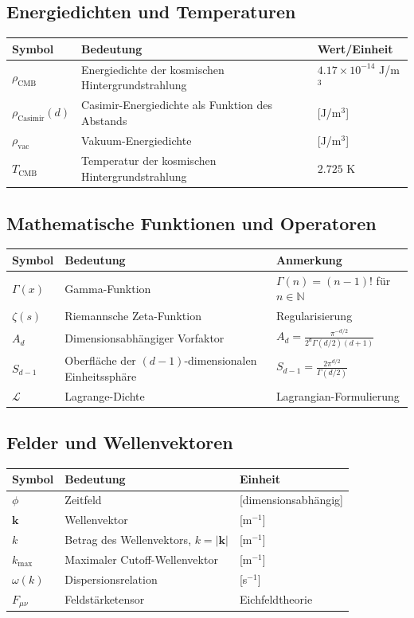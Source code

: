 	\subsection{Energiedichten und Temperaturen}
	\begin{longtable}{p{2cm} p{8cm} p{3cm}}
		\toprule
		\textbf{Symbol} & \textbf{Bedeutung} & \textbf{Wert/Einheit} \\
		\midrule
		$\rho_{\text{CMB}}$ & Energiedichte der kosmischen Hintergrundstrahlung & $4.17 \times 10^{-14}$ J/m$^3$ \\
		$\rho_{\text{Casimir}}(d)$ & Casimir-Energiedichte als Funktion des Abstands & [J/m$^3$] \\
		$\rho_{\text{vac}}$ & Vakuum-Energiedichte & [J/m$^3$] \\
		$T_{\text{CMB}}$ & Temperatur der kosmischen Hintergrundstrahlung & $2.725$ K \\
		\bottomrule
	\end{longtable}
	
	\subsection{Mathematische Funktionen und Operatoren}
	\begin{longtable}{p{2cm} p{8cm} p{3cm}}
		\toprule
		\textbf{Symbol} & \textbf{Bedeutung} & \textbf{Anmerkung} \\
		\midrule
		$\Gamma(x)$ & Gamma-Funktion & $\Gamma(n) = (n-1)!$ für $n \in \mathbb{N}$ \\
		$\zeta(s)$ & Riemannsche Zeta-Funktion & Regularisierung \\
		$A_d$ & Dimensionsabhängiger Vorfaktor & $A_d = \frac{\pi^{-d/2}}{2^d\Gamma(d/2)(d+1)}$ \\
		$S_{d-1}$ & Oberfläche der $(d-1)$-dimensionalen Einheitssphäre & $S_{d-1} = \frac{2\pi^{d/2}}{\Gamma(d/2)}$ \\
		$\mathcal{L}$ & Lagrange-Dichte & Lagrangian-Formulierung \\
		\bottomrule
	\end{longtable}
	
	\subsection{Felder und Wellenvektoren}
	\begin{longtable}{p{2cm} p{8cm} p{3cm}}
		\toprule
		\textbf{Symbol} & \textbf{Bedeutung} & \textbf{Einheit} \\
		\midrule
		$\phi$ & Zeitfeld & [dimensionsabhängig] \\
		$\mathbf{k}$ & Wellenvektor & [m$^{-1}$] \\
		$k$ & Betrag des Wellenvektors, $k = |\mathbf{k}|$ & [m$^{-1}$] \\
		$k_{\max}$ & Maximaler Cutoff-Wellenvektor & [m$^{-1}$] \\
		$\omega(k)$ & Dispersionsrelation & [s$^{-1}$] \\
		$F_{\mu\nu}$ & Feldstärketensor & Eichfeldtheorie \\
		\bottomrule
	\end{longtable}
	
